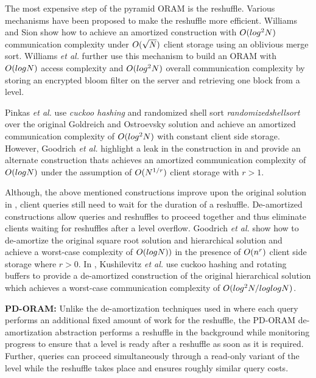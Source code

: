 The most expensive step of the pyramid ORAM is the reshuffle. Various mechanisms have been proposed to make the reshuffle 
more efficient. Williams and Sion \cite{usablepir} show how to achieve an amortized construction with $O(log^{2}N)$ communication 
complexity under $O(\sqrt{N})$ client storage using an oblivious merge sort. Williams {\em et al.} further use this mechanism to 
build an ORAM with $O(logN)$ access complexity and $O(log^{2}N)$ overall communication complexity by storing an encrypted bloom 
filter on the server and retrieving one block from a level. 

Pinkas {\em et al.} \cite{Pinkasoram} use {\em cuckoo hashing} and randomized shell sort {\em randomizedshellsort} 
over the original Goldreich and Ostroevsky solution \cite{goldreich} and achieve an amortized communication 
complexity of $O(log^{2}N)$ with constant client side storage. However, Goodrich {\em et al.} \cite{goodrichoram} 
highlight a leak in the construction in \cite{Pinkasoram} and provide an alternate construction thats achieves an amortized 
communication complexity of $O(logN)$ under the assumption of $O(N^{1/r})$ client storage with $r > 1$. 

Although, the above mentioned constructions improve upon the original solution in \cite{goldreich}, client queries still 
need to wait for the duration of a reshuffle. De-amortized constructions allow queries and reshuffles to proceed together and 
thus eliminate clients waiting for reshuffles after a level overflow. Goodrich {\em et al.} \cite{goodrich_deamortized} 
show how to de-amortize the original square root solution and hierarchical solution \cite{goldreich} and achieve a worst-case 
complexity of $O(logN))$ in the presence of $O(n^{r})$ client side storage where $r > 0$. In \cite{kushilevitzoram}, 
Kushilevitz {\em et al.} use cuckoo hashing and rotating buffers to provide a de-amortized construction of the original hierarchical 
solution \cite{goldreich} which achieves a worst-case communication complexity of $O(log^{2}N/loglogN)$. 

{\bf PD-ORAM:} Unlike the de-amortization techniques used in \cite{kushilevitzoram,goodrich_deamortized} where each query performs an 
additional fixed amount of work for the reshuffle, the PD-ORAM \cite{privatefs} de-amortization abstraction performs a reshuffle 
in the background while monitoring progress to ensure that a level is ready after a reshuffle as soon as it is required. 
Further, queries can proceed simultaneously through a read-only variant of the level while the reshuffle takes place and ensures 
roughly similar query costs.

